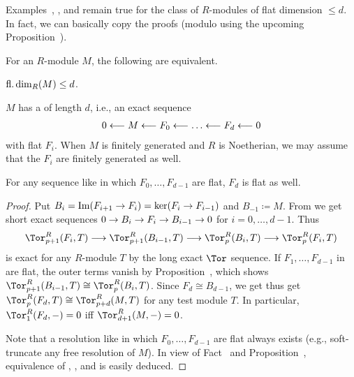 \documentclass[a4paper,parskip=half,numbers=enddot, DIV=12]{scrreprt}
\begin{document}
\begin{rem*}
	Examples~, , and  remain true for the class of $R$-modules of flat dimension $\leq d$. In fact, we can basically copy the proofs (modulo using the upcoming Proposition~).
\end{rem*}
\begin{prop}
	For an $R$-module $M$, the following are equivalent.
	\begin{alphanumerate}
		\item $\operatorname{fl.dim}_R(M)\leq d$.
		\item $M$ has a  of length $d$, i.e., an exact sequence
		\begin{align}\lbl{eq:flatResolution}
			0\lmorphism M\lmorphism F_0\lmorphism \ldots\lmorphism F_d\lmorphism 0
		\end{align}
		with flat $F_i$. When $M$ is finitely generated and $R$ is Noetherian, we may assume that the $F_i$ are finitely generated as well.
		\item For any sequence like  in which $F_0,\ldots,F_{d-1}$ are flat, $F_d$ is flat as well.
	\end{alphanumerate}
\end{prop}
\begin{proof}
	Put $B_i=\Im(F_{i+1}\morphism F_i)=\ker(F_i\morphism F_{i-1})$ and $B_{-1}\coloneqq M$. From  we get short exact sequences $0\morphism B_i\morphism F_i\morphism B_{i-1}\morphism 0$ for $i=0,\ldots,d-1$. Thus
	\begin{align*}
		\Tor_{p+1}^R(F_i,T)\morphism \Tor_{p+1}^R(B_{i-1},T)\morphism \Tor_p^R(B_i,T)\morphism\Tor_p^R(F_i,T)
	\end{align*}
	is exact for any $R$-module $T$ by the long exact $\Tor$ sequence. If $F_1,\ldots,F_{d-1}$ in  are flat, the outer terms vanish by Proposition~, which shows $\Tor_{p+1}^R(B_{i-1},T)\cong \Tor_p^R(B_i,T)$. Since $F_d\cong B_{d-1}$, we get thus get $\Tor_p^R(F_d,T)\cong \Tor_{p+d}^R(M,T)$ for any test module $T$. In particular, $\Tor_1^R(F_d,-)=0$ iff $\Tor_{d+1}^R(M,-)=0$.
	
	Note that a resolution like  in which $F_0,\ldots,F_{d-1}$ are flat always exists (e.g., soft-truncate any free resolution of $M$). In view of Fact~ and Proposition~, equivalence of , , and  is easily deduced.
\end{proof}
\end{document}
